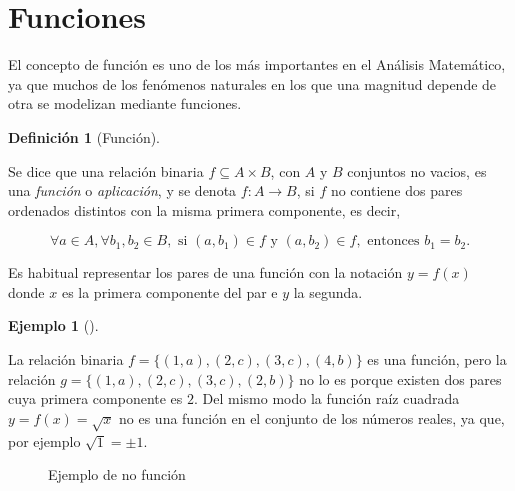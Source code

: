 \documentclass[
  a4paper,
]{scrreport}
\theoremstyle{definition}
\newtheorem{example}{Ejemplo}[chapter]
\theoremstyle{plain}
\theoremstyle{plain}
\theoremstyle{plain}
\theoremstyle{definition}
\newtheorem{definition}{Definición}[chapter]
\theoremstyle{remark}
\begin{document}
\hypertarget{funciones}{%
\section{Funciones}\label{funciones}}

El concepto de función es uno de los más importantes en el Análisis
Matemático, ya que muchos de los fenómenos naturales en los que una
magnitud depende de otra se modelizan mediante funciones.

\begin{definition}[Función]\protect\hypertarget{def-funcion}{}\label{def-funcion}

Se dice que una relación binaria \(f \subseteq A \times B\), con \(A\) y
\(B\) conjuntos no vacios, es una \emph{función} o \emph{aplicación}, y
se denota \(f:A\rightarrow B\), si \(f\) no contiene dos pares ordenados
distintos con la misma primera componente, es decir,

\[\forall a \in A, \forall b_1, b_2 \in B, \mbox{ si } (a,b_1) \in f \mbox{ y } (a,b_2) \in f, \mbox{ entonces } b_1 = b_2.\]

\end{definition}

Es habitual representar los pares de una función con la notación
\(y=f(x)\) donde \(x\) es la primera componente del par e \(y\) la
segunda.

\begin{example}[]\protect\hypertarget{exm-funcion}{}\label{exm-funcion}

La relación binaria \(f=\{(1,a), (2,c), (3,c), (4,b)\}\) es una función,
pero la relación \(g=\{(1,a), (2,c), (3,c), (2,b)\}\) no lo es porque
existen dos pares cuya primera componente es \(2\). Del mismo modo la
función raíz cuadrada \(y=f(x)=\sqrt{x}\) no es una función en el
conjunto de los números reales, ya que, por ejemplo \(\sqrt{1}=\pm 1\).

\end{example}

\begin{figure}

\begin{minipage}[t]{0.50\linewidth}

{\centering 

\raisebox{-\height}{



}

\caption{Ejemplo de función}

}

\end{minipage}%
%
\begin{minipage}[t]{0.50\linewidth}

{\centering 

\raisebox{-\height}{



}

\caption{Ejemplo de no función}

}

\end{minipage}%

\end{figure}
\end{document}
